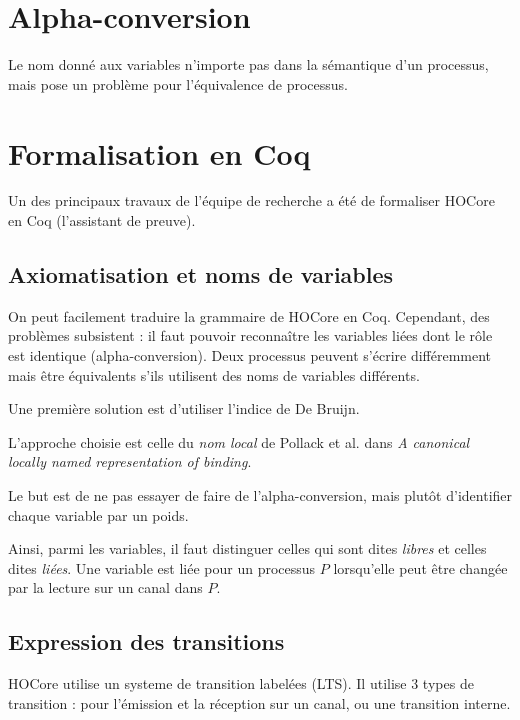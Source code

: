 \documentclass[11pt]{article}
\begin{document}
\section{Alpha-conversion}
Le nom donné aux variables n'importe pas dans la sémantique d'un processus, mais pose un problème pour l'équivalence de processus.


\section{Formalisation en Coq}
Un des principaux travaux de l'équipe de recherche a été de formaliser HOCore en Coq (l'assistant de preuve).

\subsection{Axiomatisation et noms de variables}
On peut facilement traduire la grammaire de HOCore en Coq. Cependant, des problèmes subsistent : il faut pouvoir reconnaître les variables liées dont le rôle est identique (alpha-conversion). Deux processus peuvent s'écrire différemment mais être équivalents s'ils utilisent des noms de variables différents. %

Une première solution est d'utiliser l'indice de De Bruijn. %

L'approche choisie est celle du \textit{nom local} %
de Pollack et al. dans \textit{A canonical locally named representation of binding}.

Le but est de ne pas essayer de faire de l'alpha-conversion, mais plutôt d'identifier chaque variable par un poids.


Ainsi, parmi les variables, il faut distinguer celles qui sont dites \textit{libres} et celles dites \textit{liées}.
Une variable est liée pour un processus $P$ lorsqu'elle peut être changée par la lecture sur un canal dans $P$.



\subsection{Expression des transitions}
HOCore utilise un systeme de transition labelées (LTS). Il utilise 3 types de transition : pour l'émission et la réception sur un canal, ou une transition interne.
\end{document}
